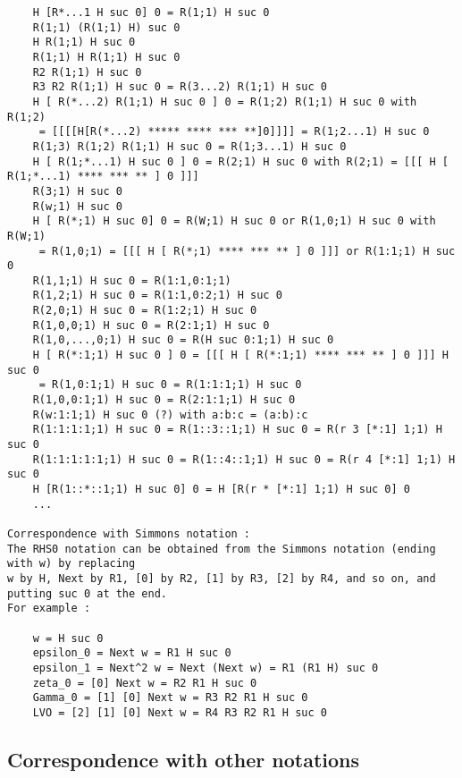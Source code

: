 \documentclass[10pt]{article}
\begin{document}
\begin{verbatim}
    H [R*...1 H suc 0] 0 = R(1;1) H suc 0
    R(1;1) (R(1;1) H) suc 0
    H R(1;1) H suc 0
    R(1;1) H R(1;1) H suc 0
    R2 R(1;1) H suc 0
    R3 R2 R(1;1) H suc 0 = R(3...2) R(1;1) H suc 0
    H [ R(*...2) R(1;1) H suc 0 ] 0 = R(1;2) R(1;1) H suc 0 with R(1;2) 
     = [[[[H[R(*...2) ***** **** *** **]0]]]] = R(1;2...1) H suc 0
    R(1;3) R(1;2) R(1;1) H suc 0 = R(1;3...1) H suc 0
    H [ R(1;*...1) H suc 0 ] 0 = R(2;1) H suc 0 with R(2;1) = [[[ H [ R(1;*...1) **** *** ** ] 0 ]]]
    R(3;1) H suc 0
    R(w;1) H suc 0
    H [ R(*;1) H suc 0] 0 = R(W;1) H suc 0 or R(1,0;1) H suc 0 with R(W;1) 
     = R(1,0;1) = [[[ H [ R(*;1) **** *** ** ] 0 ]]] or R(1:1;1) H suc 0
    R(1,1;1) H suc 0 = R(1:1,0:1;1)
    R(1,2;1) H suc 0 = R(1:1,0:2;1) H suc 0
    R(2,0;1) H suc 0 = R(1:2;1) H suc 0
    R(1,0,0;1) H suc 0 = R(2:1;1) H suc 0
    R(1,0,...,0;1) H suc 0 = R(H suc 0:1;1) H suc 0
    H [ R(*:1;1) H suc 0 ] 0 = [[[ H [ R(*:1;1) **** *** ** ] 0 ]]] H suc 0 
     = R(1,0:1;1) H suc 0 = R(1:1:1;1) H suc 0
    R(1,0,0:1;1) H suc 0 = R(2:1:1;1) H suc 0
    R(w:1:1;1) H suc 0 (?) with a:b:c = (a:b):c
    R(1:1:1:1;1) H suc 0 = R(1::3::1;1) H suc 0 = R(r 3 [*:1] 1;1) H suc 0
    R(1:1:1:1:1;1) H suc 0 = R(1::4::1;1) H suc 0 = R(r 4 [*:1] 1;1) H suc 0
    H [R(1::*::1;1) H suc 0] 0 = H [R(r * [*:1] 1;1) H suc 0] 0
    ... 

Correspondence with Simmons notation :
The RHS0 notation can be obtained from the Simmons notation (ending with w) by replacing 
w by H, Next by R1, [0] by R2, [1] by R3, [2] by R4, and so on, and putting suc 0 at the end.
For example :

    w = H suc 0
    epsilon_0 = Next w = R1 H suc 0
    epsilon_1 = Next^2 w = Next (Next w) = R1 (R1 H) suc 0
    zeta_0 = [0] Next w = R2 R1 H suc 0
    Gamma_0 = [1] [0] Next w = R3 R2 R1 H suc 0
    LVO = [2] [1] [0] Next w = R4 R3 R2 R1 H suc 0 

\end{verbatim}

\subsection{Correspondence with other notations}
\end{document}
